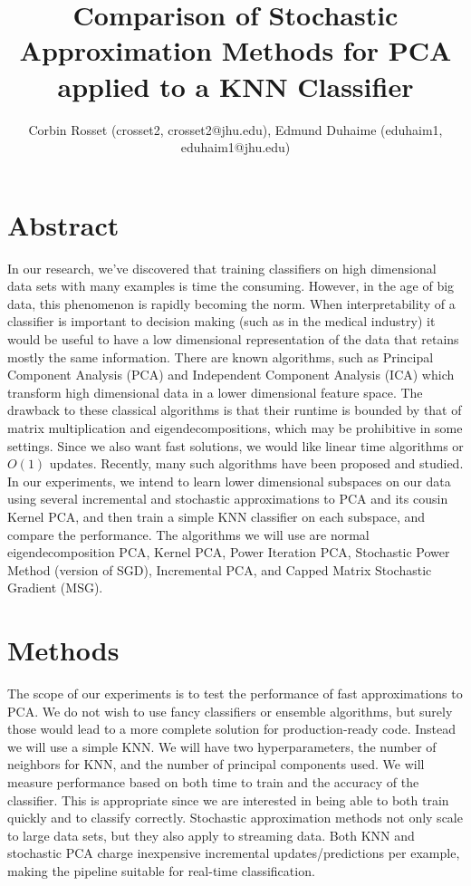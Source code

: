 \documentclass[11pt]{article}
\title{Comparison of Stochastic Approximation Methods for PCA applied to a KNN Classifier}
\author{Corbin Rosset (crosset2, crosset2@jhu.edu), Edmund Duhaime (eduhaim1, eduhaim1@jhu.edu)}
\date{}
\begin{document}
\maketitle

\section{Abstract}
In our research, we’ve discovered that training classifiers on high dimensional data sets with many examples is time the consuming. However, in the age of big data, this phenomenon is rapidly becoming the norm. When interpretability of a classifier is important to decision making (such as in the medical industry) it would be useful to have a low dimensional representation of the data that retains mostly the same information. There are known algorithms, such as Principal Component Analysis (PCA) and Independent Component Analysis (ICA) which  transform high dimensional data in a lower dimensional feature space. The drawback to these classical algorithms is that their runtime is bounded by that of matrix multiplication and eigendecompositions, which may be prohibitive in some settings. Since we also want fast solutions, we would like linear time algorithms or $O(1)$ updates. Recently, many such algorithms have been proposed and studied. 
In our experiments, we intend to learn lower dimensional subspaces on our data using several incremental and stochastic approximations to PCA and its cousin Kernel PCA, and then train a simple KNN classifier on each subspace, and compare the performance. The algorithms we will use are normal eigendecomposition PCA, Kernel PCA, Power Iteration PCA, Stochastic Power Method (version of SGD), Incremental PCA, and Capped Matrix Stochastic Gradient (MSG). 


\section{Methods}
The scope of our experiments is to test the performance of fast approximations to PCA. We do not wish to use fancy classifiers or ensemble algorithms, but surely those would lead to a more complete solution for production-ready code. Instead we will use a simple KNN. We will have two hyperparameters, the number of neighbors for KNN, and the number of principal components used. We will measure performance based on both time to train and the accuracy of the classifier. This is appropriate since we are interested in being able to both train quickly and to classify correctly. Stochastic approximation methods not only scale to large data sets, but they also apply to streaming data. Both KNN and stochastic PCA charge inexpensive incremental updates/predictions per example, making the pipeline suitable for real-time classification. 
\end{document}
